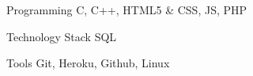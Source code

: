 \documentclass{tccv}
\begin{document}
\begin{factlist}

\item{Programming}
     {C, C++, HTML5 \& CSS, JS, PHP}

\item{Technology Stack}
	{SQL}

\item{Tools}
     {Git, Heroku, Github, Linux}


\end{factlist}




\end{document}
